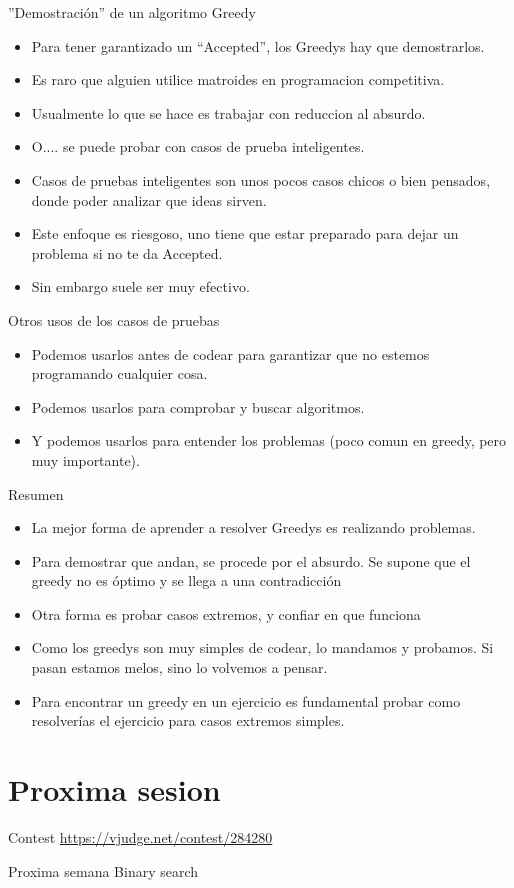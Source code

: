 \documentclass{beamer}
\begin{document}
\begin{frame}{''Demostración'' de un algoritmo Greedy}
  \begin{itemize}
    \item Para tener garantizado un “Accepted”, los Greedys hay que
      demostrarlos.\pause
    \item Es raro que alguien utilice matroides en programacion competitiva.\pause
    \item Usualmente lo que se hace es trabajar con reduccion al absurdo.\pause
    \item O.... se puede probar con casos de prueba inteligentes.\pause
    \item Casos de pruebas inteligentes son unos pocos casos chicos o
      bien pensados, donde poder analizar que ideas sirven.\pause
    \item Este enfoque es riesgoso, uno tiene que estar preparado para
      dejar un problema si no te da Accepted.\pause
    \item Sin embargo suele ser muy efectivo.
  \end{itemize}
\end{frame}

\begin{frame}{Otros usos de los casos de pruebas}
  \begin{itemize}
    \item Podemos usarlos antes de codear para garantizar que no
      estemos programando cualquier cosa.\pause
    \item Podemos usarlos para comprobar y buscar algoritmos.\pause
    \item Y podemos usarlos para entender los problemas 
      (poco comun en greedy, pero muy importante).\pause
  \end{itemize}
\end{frame}

\begin{frame}{Resumen}
  \begin{itemize}
    \item La mejor forma de aprender a resolver Greedys es realizando
      problemas.
    \item Para demostrar que andan, se procede por el absurdo. Se supone
      que el greedy no es óptimo y se llega a una contradicción
    \item Otra forma es probar casos extremos, y confiar en que funciona
    \item Como los greedys son muy simples de codear, lo mandamos y
      probamos. Si pasan estamos melos, sino lo volvemos a pensar.
    \item Para encontrar un greedy en un ejercicio es fundamental probar
      como resolverías el ejercicio para casos extremos simples.
  \end{itemize}
\end{frame}

\section{Proxima sesion}
\begin{frame}{Contest}
  \centering
  \url{https://vjudge.net/contest/284280}
\end{frame}

\begin{frame}{Proxima semana}
  \centering 
  \Large
  Binary search
\end{frame}
\end{document}

